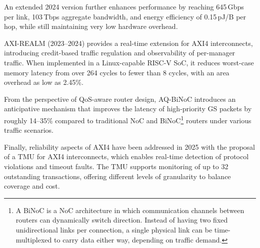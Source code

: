 An extended 2024 version further enhances performance by reaching 645\,Gbps per link, 103\,Tbps aggregate bandwidth, and energy efficiency of 0.15\,pJ/B per hop, while still maintaining very low hardware overhead.\cite{fischer_floonoc_2025}

AXI-REALM (2023--2024) provides a real-time extension for AXI4 interconnects, introducing credit-based traffic regulation and observability of per-manager traffic. When implemented in a Linux-capable RISC-V SoC, it reduces worst-case memory latency from over 264 cycles to fewer than 8 cycles, with an area overhead as low as 2.45\%.\cite{benz_axi-realm_2023}\cite{benz_axi-realm_2025}

From the perspective of QoS-aware router design, AQ-BiNoC introduces an anticipative mechanism that improves the latency of high-priority \ac{GS} packets by roughly 14--35\% compared to traditional NoC and \ac{BiNoC}\footnote{A BiNoC is a NoC architecture in which communication channels between routers can dynamically switch direction. Instead of having two fixed unidirectional links per connection, a single physical link can be time-multiplexed to carry data either way, depending on traffic demand.} routers under various traffic scenarios.\cite{tsai_anticipative_2022} 

Finally, reliability aspects of AXI4 have been addressed in 2025 with the proposal of a \ac{TMU} for AXI4 interconnects, which enables real-time detection of protocol violations and timeout faults. The \ac{TMU} supports monitoring of up to 32 outstanding transactions, offering different levels of granularity to balance coverage and cost.\cite{liang_towards_2025}
